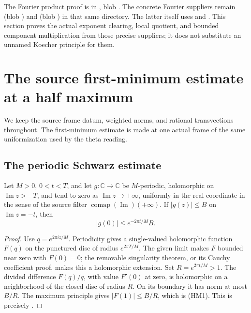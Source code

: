 The Fourier product proof is in
,
blob .
The concrete Fourier suppliers remain
(blob )
and
(blob )
in that same directory.
The latter itself uses
and .
This section proves the actual exponent clearing, local quotient,
and bounded component multiplication from those precise suppliers;
it does not substitute an unnamed Koecher principle for them.

\section{The source first-minimum estimate at a half maximum}
\label{sec:sr-source-half-maximum}
We keep the source frame datum, weighted norms, and rational
transvections throughout. The first-minimum estimate is made at
one actual frame of the same uniformization used by the theta reading.

\subsection{The periodic Schwarz estimate}
\begin{srlemma}\label{lem:sr-source-periodic-schwarz}
Let \(M>0\), \(0<t<T\), and let \(g:\mathbb C\to\mathbb C\) be
\(M\)-periodic, holomorphic on \(\operatorname{Im}z>-T\), and tend
to zero as \(\operatorname{Im}z\to+\infty\), uniformly in the real
coordinate in the sense of the source filter
\(\operatorname{comap}(\operatorname{Im})(+\infty)\).
If \(|g(z)|\le B\) on \(\operatorname{Im}z=-t\), then
\[
                    |g(0)|\le e^{-2\pi t/M}B .
 \tag{HM1}\label{eq:sr-source-periodic-schwarz}
\]
\end{srlemma}
\begin{proof}
Use \(q=e^{2\pi iz/M}\). Periodicity gives a single-valued
holomorphic function \(F(q)\) on the punctured disc of radius
\(e^{2\pi T/M}\).
The given limit makes \(F\) bounded near zero with \(F(0)=0\);
the removable singularity theorem, or its Cauchy coefficient proof,
makes this a holomorphic extension.
Set \(R=e^{2\pi t/M}>1\).
The divided difference \(F(q)/q\), with value \(F'(0)\) at zero,
is holomorphic on a neighborhood of the closed disc of radius \(R\).
On its boundary it has norm at most \(B/R\).
The maximum principle gives \(|F(1)|\le B/R\), which is (HM1).
This is precisely
.
\end{proof}

